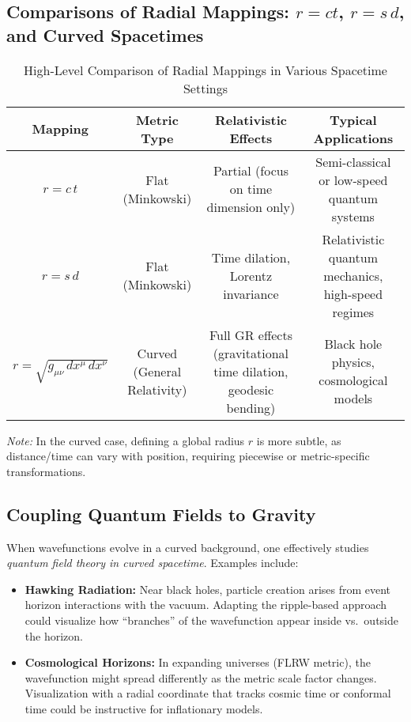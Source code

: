 \subsection{Comparisons of Radial Mappings: \texorpdfstring{$r=ct$}{r=ct}, \texorpdfstring{$r=s\,d$}{r=s d}, and Curved Spacetimes}
\begin{table}[H]
\centering
\caption{High-Level Comparison of Radial Mappings in Various Spacetime Settings}
\label{tab:metric_comparison}
\begin{tabular}{|c|c|c|c|}
\hline
\textbf{Mapping} & \textbf{Metric Type} & \textbf{Relativistic Effects} & \textbf{Typical Applications} \\
\hline
$r = c\,t$
& Flat (Minkowski)
& Partial (focus on time dimension only)
& Semi-classical or low-speed quantum systems \\
\hline
$r = s\,d$
& Flat (Minkowski)
& Time dilation, Lorentz invariance
& Relativistic quantum mechanics, high-speed regimes \\
\hline
$r = \sqrt{g_{\mu\nu} \,dx^\mu \,dx^\nu}$
& Curved (General Relativity)
& Full GR effects (gravitational time dilation, geodesic bending)
& Black hole physics, cosmological models \\
\hline
\end{tabular}
\end{table}

\noindent
\textit{Note:} In the curved case, defining a global radius \(r\) is more subtle, as distance/time can vary with position, requiring piecewise or metric-specific transformations.

\subsection{Coupling Quantum Fields to Gravity}
When wavefunctions evolve in a curved background, one effectively studies \emph{quantum field theory in curved spacetime}. Examples include:
\begin{itemize}
    \item \textbf{Hawking Radiation:}
    Near black holes, particle creation arises from event horizon interactions with the vacuum. Adapting the ripple-based approach could visualize how “branches” of the wavefunction appear inside vs.\ outside the horizon.
    \item \textbf{Cosmological Horizons:}
    In expanding universes (FLRW metric), the wavefunction might spread differently as the metric scale factor changes. Visualization with a radial coordinate that tracks cosmic time or conformal time could be instructive for inflationary models.
\end{itemize}

